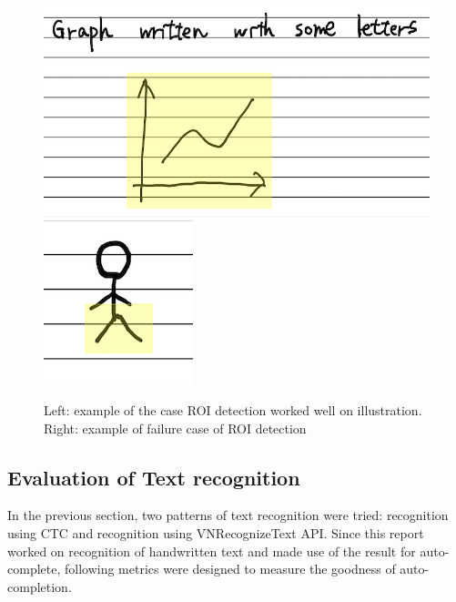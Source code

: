 \begin{figure}
    \centering
    \includegraphics[scale=0.4]{images/illustration.png}
    \includegraphics[scale=0.9]{images/failure.png}
    \caption{Left: example of the case ROI detection worked well on illustration. Right: example of failure case of ROI detection}
    \label{fig:failure}
\end{figure}

\subsection{Evaluation of Text recognition}
In the previous section, two patterns of text recognition were tried: recognition using
CTC and recognition using VNRecognizeText API. Since this report worked on recognition of
handwritten text and made use of the result for auto-complete, following metrics were
designed to measure the goodness of auto-completion.

